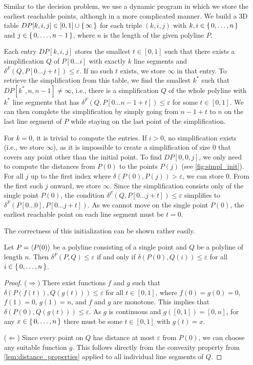 Similar to the decision problem, we use a dynamic program in which we store the earliest reachable points, although in a more complicated manner. We build a 3D table \(DP[k,i,j] \in [0, 1] \cup \set{\infty}\) for each triple \((k, i, j)\) with \(k, i \in \set{0, \dots, n}\) and \(j \in \set{0, \dots, n - 1}\), where \(n\) is the length of the given polyline \(P\).

Each entry \(DP[k, i, j]\) stores the smallest \(t \in [0, 1]\) such that there exists a simplification \(Q\) of \(P[0 \dots i]\) with exactly \(k\) line segments and \(\delta^F(Q, P[0\dots j + t]) \leq \varepsilon\). If no such \(t\) exists, we store \(\infty\) in that entry.
To retrieve the simplification from this table, we find the smallest \(k^*\) such that \(DP[k^*, n, n - 1] \neq \infty\), i.e., there is a simplification \(Q\) of the whole polyline with \(k^*\) line segments that has \(\delta^F(Q, P[0\dots n - 1 + t]) \leq \varepsilon\) for some \(t \in [0, 1]\). We can then complete the simplification by simply going from \(n-1+t\) to \(n\) on the last line segment of \(P\) while staying on the last point of the simplification.

For \(k = 0\), it is trivial to compute the entries. If \(i > 0\), no simplification exists (i.e., we store \(\infty\)), as it is impossible to create a simplification of size \(0\) that covers any point other than the initial point. To find \(DP[0, 0, j]\), we only need to compute the distances from \(P(0)\) to the points \(P(j)\) (see \cref{fig:simpl_init}). For all \(j\) up to the first index where \(\delta(P(0), P(j)) > \varepsilon\), we can store \(0\). From the first such \(j\) onward, we store \(\infty\). Since the simplification consists only of the single point \(P(0)\), the condition \(\delta^F(Q, P[0\dots j + t]) \leq \varepsilon\) simplifies to \(\delta^F(P[0 \dots 0], P[0 \dots j + t])\). As we cannot move on the single point \(P(0)\), the earliest reachable point on each line segment must be \(t = 0\).

The correctness of this initialization can be shown rather easily.
\begin{lemma}
  Let \(P = \left\langle P(0)\right\rangle\) be a polyline consisting of a single point and \(Q\) be a polyline of length \(n\). Then \(\delta^F(P, Q) \leq \varepsilon\) if and only if \(\delta(P(0), Q(i)) \leq \varepsilon\) for all \(i \in \set{0, \dots, n}\).
\end{lemma}
\begin{proof}
	(\(\Rightarrow\)) There exist functions \(f\) and \(g\) such that \(\delta(P(f(t)), Q(g(t))) \leq \varepsilon\) for all \(t\in [0,1]\), where \(f(0) = g(0) = 0\), \(f(1) = 0\), \(g(1) = n\), and \(f\) and \(g\) are monotone. This implies that \(\delta(P(0), Q(g(t))) \leq \varepsilon\). As \(g\) is continuous and \(g([0,1]) = [0, n]\), for any \(x\in \set{0, \dots, n}\) there must be some \(t \in [0,1]\) with \(g(t) = x\).
  
  (\(\Leftarrow\)) Since every point on \(Q\) has distance at most \(\varepsilon\) from \(P(0)\), we can choose any suitable function \(g\). This follows directly from the convexity property from \cref{lem:distance_properties} applied to all individual line segments of \(Q\).
\end{proof}

